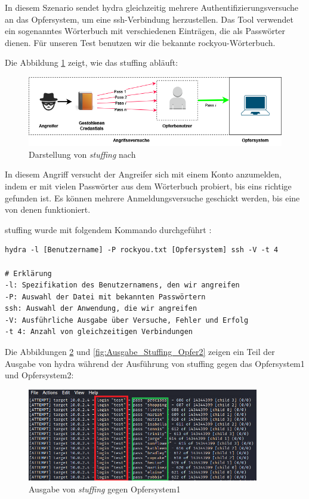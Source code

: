 In diesem Szenario sendet \gls{hydra} gleichzeitig mehrere Authentifizierungsversuche an das Opfersystem, um eine \gls{ssh}-Verbindung herzustellen. Das Tool verwendet ein sogenanntes Wörterbuch mit verschiedenen Einträgen, die als Passwörter dienen. Für unseren Test benutzen wir die bekannte \gls{rockyou}-Wörterbuch.

Die Abbildung \ref{fig:stuffing} zeigt, wie das \gls{stuffing} abläuft:
\begin{figure}[H]
   \centering
   \includegraphics[width=1\textwidth]{assets/Stuffing.png}
   \caption[Darstellung von \textit{\gls{stuffing}}]
   {Darstellung von \textit{\gls{stuffing}} nach \cite{Nguyen_stuffing}}
   \label{fig:stuffing}
   \centering
\end{figure}

In diesem Angriff versucht der Angreifer sich mit einem Konto anzumelden, indem er mit vielen Passwörter aus dem Wörterbuch probiert, bis eins richtige gefunden ist. Es können mehrere Anmeldungsversuche geschickt werden, bis eine von denen funktioniert.

\newpage
\gls{stuffing} wurde mit folgendem Kommando durchgeführt \citep{kali_hydra}:
{
\begin{Verbatim}[frame=single]
hydra -l [Benutzername] -P rockyou.txt [Opfersystem] ssh -V -t 4

# Erklärung
-l: Spezifikation des Benutzernamens, den wir angreifen
-P: Auswahl der Datei mit bekannten Passwörtern
ssh: Auswahl der Anwendung, die wir angreifen
-V: Ausführliche Ausgabe über Versuche, Fehler und Erfolg
-t 4: Anzahl von gleichzeitigen Verbindungen
\end{Verbatim}
}

Die Abbildungen \ref{fig:Ausgabe_Stuffing_Opfer1} und \ref{fig:Ausgabe_Stuffing_Opfer2} zeigen ein Teil der Ausgabe von \gls{hydra} während der Ausführung von \gls{stuffing} gegen das Opfersystem1 und Opfersystem2:
\begin{figure}[H]
   \centering
   \includegraphics[width=0.9\textwidth]{assets/stuffing_kali.png}
   \caption[Ausgabe von \textit{\gls{stuffing}} gegen Opfersystem1]
   {Ausgabe von \textit{\gls{stuffing}} gegen Opfersystem1}
   \label{fig:Ausgabe_Stuffing_Opfer1}
   \centering
\end{figure}

